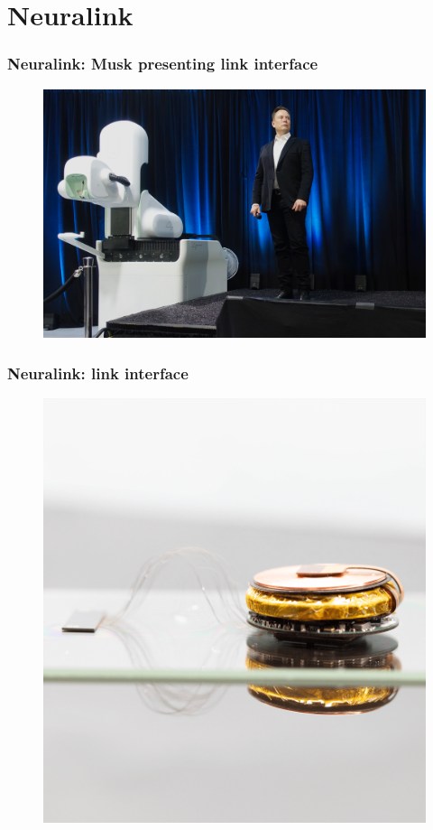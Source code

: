 \documentclass[12pt, aspectratio=169]{beamer}
\begin{document}


\section{Neuralink}

\begin{frame}
  \frametitle{Neuralink: Musk presenting link interface}
  \begin{figure}
    \includegraphics[width=0.6\linewidth]{Elon_Musk_and_the_Neuralink_Future}
  \end{figure}
\end{frame}


\begin{frame}
  \frametitle{Neuralink: link interface}
  \begin{figure}
    \includegraphics[width=0.4\linewidth]{approach-link-1}
  \end{figure}
\end{frame}
\end{document}
